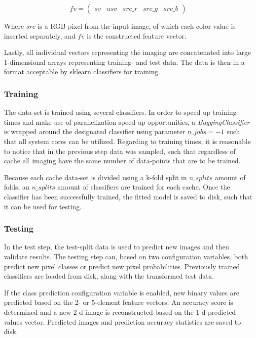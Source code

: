 $$fv = \begin{pmatrix}sv & usv & src\_r & src\_g & src\_b\end{pmatrix}$$

Where $src$ is a RGB pixel from the input image, of which each color value is inserted separately, and $fv$ is the constructed feature vector.

Lastly, all individual vectors representing the imaging are concatenated into large $1$-dimensional arrays representing training- and test data. The data is then in a format acceptable by sklearn classifiers for training.

\subsubsection{Training}
The data-set is trained using several classifiers. In order to speed up training times and make use of parallelization speed-up opportunities, a \textit{BaggingClassifier} is wrapped around the designated classifier using parameter $n\_jobs=-1$ such that all system cores can be utilized. Regarding to training times, it is reasonable to notice that in the previous step data was sampled, such that regardless of cache all imaging have the same number of data-points that are to be trained.

Because each cache data-set is divided using a k-fold split in $n\_splits$ amount of folds, an $n\_splits$ amount of classifiers are trained for each cache. Once the classifier has been successfully trained, the fitted model is saved to disk, such that it can be used for testing. 

\subsubsection{Testing}
In the test step, the test-split data is used to predict new images and then validate results. The testing step can, based on two configuration variables, both predict new pixel classes or predict new pixel probabilities. Previously trained classifiers are loaded from disk, along with the transformed test data.

If the class prediction configuration variable is enabled, new binary values are predicted based on the 2- or 5-element feature vectors. An accuracy score is determined and a new 2-d image is reconstructed based on the 1-d predicted values vector. Predicted images and prediction accuracy statistics are saved to disk.

